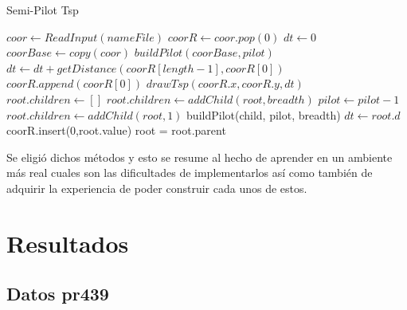 \documentclass{article}
\begin{document}
	\begin{algorithm}[H]
		\caption{Semi-Pilot Tsp}\label{SemiPilotTsp}
		\begin{algorithmic}[1]
			\State $coor \gets ReadInput(nameFile)$ 
			\State $coorR \gets coor.pop(0)$ 
			\State $dt \gets 0$ 
			\State $coorBase \gets copy(coor)$ 
			\State $buildPilot(coorBase, pilot)$ 
			\State $dt \gets dt + getDistance(coorR[length - 1], coorR[0])$ 
			\State $coorR.append(coorR[0])$ 
			\State $drawTsp(coorR.x, coorR.y, dt)$
			\EndProcedure
			\\
			\State $root.children \gets []$
			 
			\State $root.children \gets addChild(root, breadth)$
			\State $pilot \gets pilot - 1$
			\Else {}
			\State $root.children \gets addChild(root, 1)$
			\EndIf
			\State buildPilot(child, pilot, breadth)
			\EndFor
			\Else {}
			 
			\State $dt \gets root.d$
			\State coorR.insert(0,root.value) 
			\State root = root.parent
			\EndWhile
			\EndIf
			\EndIf
			\EndProcedure
		\end{algorithmic}
	\end{algorithm}
	
	Se eligió dichos métodos y esto se resume al hecho de aprender en un ambiente más real cuales son las dificultades de implementarlos así como también de adquirir la experiencia de poder construir cada unos de estos.
	
	\section{Resultados}
	
	\subsection{Datos pr439}
	
\end{document}
